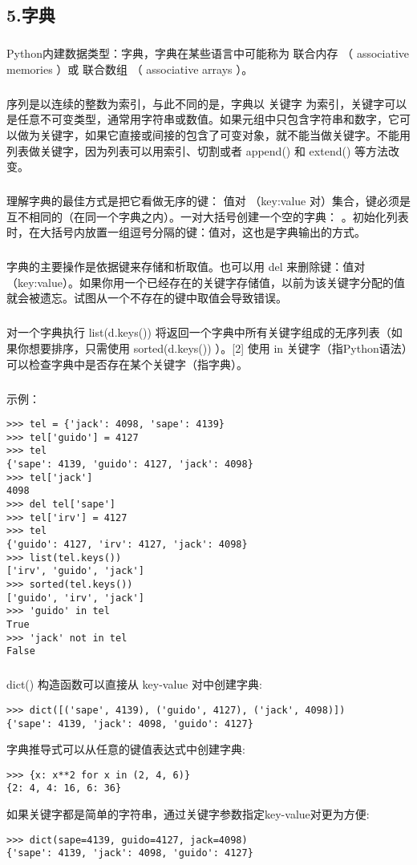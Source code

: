 \documentclass{article}
\begin{document}
\begin{CJK}{UTF8}{gbsn}
\section*{5.字典}
\subparagraph*{}
Python内建数据类型：字典，字典在某些语言中可能称为 联合内存 （ associative memories ）或 联合数组 （ associative arrays ）。
\subparagraph*{}
序列是以连续的整数为索引，与此不同的是，字典以 关键字 为索引，关键字可以是任意不可变类型，通常用字符串或数值。如果元组中只包含字符串和数字，它可以做为关键字，如果它直接或间接的包含了可变对象，就不能当做关键字。不能用列表做关键字，因为列表可以用索引、切割或者 append() 和 extend() 等方法改变。
\subparagraph*{}
理解字典的最佳方式是把它看做无序的键： 值对 （key:value 对）集合，键必须是互不相同的（在同一个字典之内）。一对大括号创建一个空的字典： {} 。初始化列表时，在大括号内放置一组逗号分隔的键：值对，这也是字典输出的方式。
\subparagraph*{}
字典的主要操作是依据键来存储和析取值。也可以用 del 来删除键：值对（key:value）。如果你用一个已经存在的关键字存储值，以前为该关键字分配的值就会被遗忘。试图从一个不存在的键中取值会导致错误。
\subparagraph*{}
对一个字典执行 list(d.keys()) 将返回一个字典中所有关键字组成的无序列表（如果你想要排序，只需使用 sorted(d.keys()) ）。[2] 使用 in 关键字（指Python语法）可以检查字典中是否存在某个关键字（指字典）。
\subparagraph*{}
示例：
\begin{verbatim}
>>> tel = {'jack': 4098, 'sape': 4139}
>>> tel['guido'] = 4127
>>> tel
{'sape': 4139, 'guido': 4127, 'jack': 4098}
>>> tel['jack']
4098
>>> del tel['sape']
>>> tel['irv'] = 4127
>>> tel
{'guido': 4127, 'irv': 4127, 'jack': 4098}
>>> list(tel.keys())
['irv', 'guido', 'jack']
>>> sorted(tel.keys())
['guido', 'irv', 'jack']
>>> 'guido' in tel
True
>>> 'jack' not in tel
False
\end{verbatim}
\subparagraph*{}
dict() 构造函数可以直接从 key-value 对中创建字典:
\begin{verbatim}
>>> dict([('sape', 4139), ('guido', 4127), ('jack', 4098)])
{'sape': 4139, 'jack': 4098, 'guido': 4127}
\end{verbatim}
字典推导式可以从任意的键值表达式中创建字典:
\begin{verbatim}
>>> {x: x**2 for x in (2, 4, 6)}
{2: 4, 4: 16, 6: 36}
\end{verbatim}
如果关键字都是简单的字符串，通过关键字参数指定key-value对更为方便:
\begin{verbatim}
>>> dict(sape=4139, guido=4127, jack=4098)
{'sape': 4139, 'jack': 4098, 'guido': 4127}
\end{verbatim}

\end{CJK}
\end{document}

